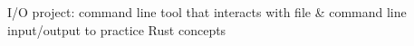 I/O project: command line tool that interacts with file & command line input/output to practice Rust concepts 
